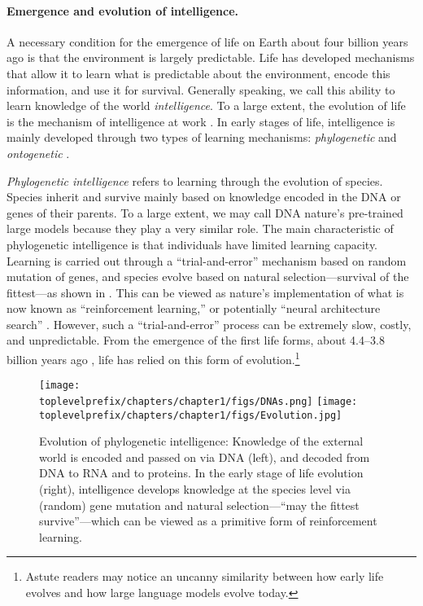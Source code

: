 \documentclass[../../book-main.tex]{subfiles}
\begin{document}
\paragraph{Emergence and evolution of intelligence.}

A necessary condition for the emergence of life on Earth about four billion years ago is that the environment is largely predictable. Life has developed mechanisms that allow it to learn what is predictable about the environment, encode this information, and use it for survival. Generally speaking, we call this ability to learn knowledge of the world \textit{intelligence}. To a large extent, the evolution of life is the mechanism of intelligence at work \cite{Bennett-2023}. In early stages of life, intelligence is mainly developed through two types of learning mechanisms: \textit{phylogenetic} and \textit{ontogenetic} \cite{Wiener-Cybernetics-1961}.

\textit{Phylogenetic intelligence} refers to learning through the evolution of species. Species inherit and survive mainly based on knowledge encoded in the DNA or genes of their parents. To a large extent, we may call DNA nature's pre-trained large models because they play a very similar role. The main characteristic of phylogenetic intelligence is that individuals have limited learning capacity. Learning is carried out through a ``trial-and-error'' mechanism based on random mutation of genes, and species evolve based on natural selection---survival of the fittest---as shown in . This can be viewed as nature's implementation of what is now known as ``reinforcement learning,'' \cite{Sutton-Barto} or potentially ``neural architecture search'' \cite{NAS-1}. However, such a ``trial-and-error'' process can be extremely slow, costly, and unpredictable. From the emergence of the first life forms, about 4.4--3.8 billion years ago \citep{bell2015potentially}, life has relied on this form of evolution.\footnote{Astute readers may notice an uncanny similarity between how early life evolves and how large language models evolve today.}

\begin{figure}
    \centering
    \texttt{[image: \\toplevelprefix/chapters/chapter1/figs/DNAs.png]}
    \texttt{[image: \\toplevelprefix/chapters/chapter1/figs/Evolution.jpg]}
    \caption{Evolution of phylogenetic intelligence: Knowledge of the external world is encoded and passed on via DNA (left), and decoded from DNA to RNA and to proteins. In the early stage of life evolution (right), intelligence develops knowledge at the species level via (random) gene mutation and natural selection---``may the fittest survive''---which can be viewed as a primitive form of reinforcement learning.}
    \label{fig:phylogenetic}
\end{figure}
\end{document}
